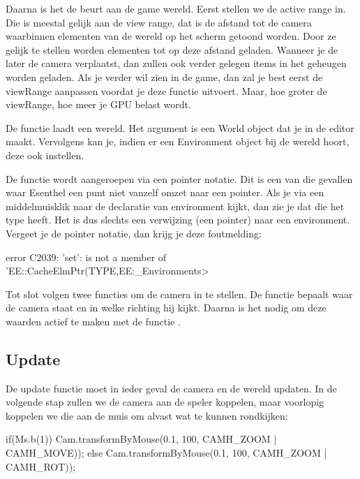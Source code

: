 Daarna is het de beurt aan de game wereld. Eerst stellen we de active range in. Die is meestal gelijk aan de view range, dat is de afstand tot de camera waarbinnen elementen van de wereld op het scherm getoond worden. Door ze gelijk te stellen worden elementen tot op deze afstand geladen. Wanneer je de later de camera verplaatst, dan zullen ook verder gelegen items in het geheugen worden geladen. Als je verder wil zien in de game, dan zal je best eerst de viewRange aanpassen voordat je deze functie uitvoert. Maar, hoe groter de viewRange, hoe meer je GPU belast wordt.

De functie  laadt een wereld. Het argument is een World object dat je in de editor maakt. Vervolgens kan je, indien er een Environment object bij de wereld hoort, deze ook instellen.	

\begin{note}
De functie  wordt aangeroepen via een pointer notatie. Dit is een van die gevallen waar Esenthel een punt niet vanzelf omzet naar een pointer. Als je via een middelmuisklik naar de declaratie van environment kijkt, dan zie je dat die het type  heeft. Het is dus slechts een verwijzing (een pointer) naar een environment. Vergeet je de pointer notatie, dan krijg je deze foutmelding:

\begin{code}
error C2039: 'set': is not a member of 'EE::CacheElmPtr(TYPE,EE:_Environments>
\end{code}
\end{note}

Tot slot volgen twee functies om de camera in te stellen. De functie  bepaalt waar de camera staat en in welke richting hij kijkt. Daarna is het nodig om deze waarden actief te maken met de functie .

\subsection{Update}

De update functie moet in ieder geval de camera en de wereld updaten. In de volgende stap zullen we de camera aan de speler koppelen, maar voorlopig koppelen we die aan de muis om alvast wat te kunnen rondkijken:

\begin{code}
if(Ms.b(1)) {
   Cam.transformByMouse(0.1, 100, CAMH_ZOOM | CAMH_MOVE));
} else
{
   Cam.transformByMouse(0.1, 100, CAMH_ZOOM | CAMH_ROT));
}
\end{code}

